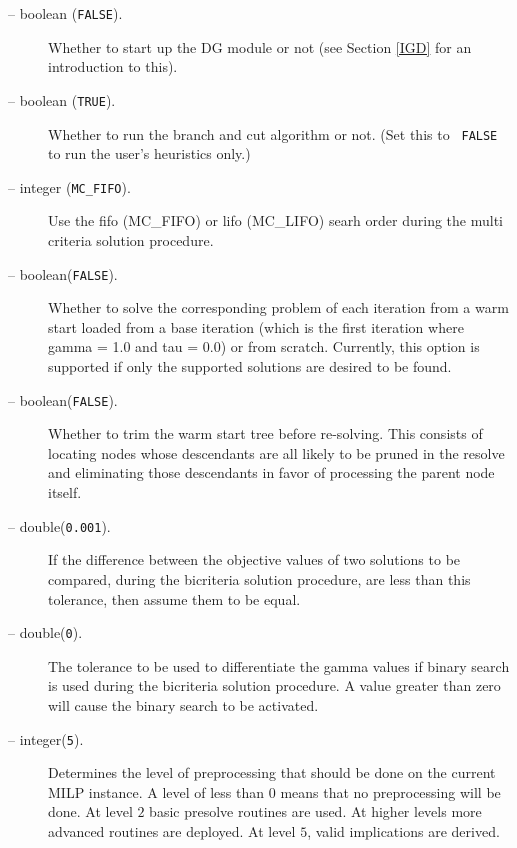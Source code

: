 \begin{description}
\item[ -- boolean ({\tt FALSE}).] 
Whether to start up the DG module or not (see Section \ref{IGD} for
an introduction to this).

\item[ -- boolean ({\tt TRUE}).] 
Whether to run the branch and cut algorithm or not. (Set this to {\tt
FALSE} to run the user's heuristics only.)

\item[ -- integer ({\tt MC\_FIFO}).] 
Use the fifo (MC\_FIFO) or lifo (MC\_LIFO) searh order during the multi
criteria solution procedure.

\item[ -- boolean({\tt FALSE}).] 
Whether to solve the corresponding problem of each iteration from a warm 
start loaded from a base iteration (which is the first iteration where 
gamma = 1.0 and tau = 0.0) or from scratch. Currently, this option is 
supported if only the supported solutions are desired to be found.

\item[ -- boolean({\tt FALSE}).] 
Whether to trim the warm start tree before re-solving. This consists of 
locating nodes whose descendants are all likely to be pruned in the resolve 
and eliminating those descendants in favor of processing the parent node 
itself.

\item[ -- double({\tt 0.001}).] 
If the difference between the objective values of two solutions to be compared,
during the bicriteria solution procedure, are less than this tolerance, then 
assume them to be equal. 

\item[ -- double({\tt 0}).] 
The tolerance to be used to differentiate the gamma values if binary search 
is used during the bicriteria solution procedure. A value greater than zero
will cause the binary search to be activated.

\item[ -- integer({\tt 5}).]
Determines the level of preprocessing that should be done on the current MILP
instance. A level of less than $0$ means that no preprocessing will be done.
At level $2$ basic presolve routines are used. At higher levels more advanced
routines are deployed. At level $5$, valid implications are derived.


\end{description}
